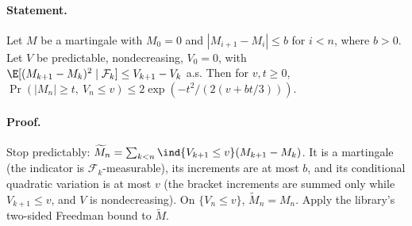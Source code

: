 \paragraph{Statement.} Let $M$ be a martingale with $M_0=0$ and $|M_{i+1}-M_i|\leq b$ for $i<n$, where
$b>0$. Let $V$ be predictable, nondecreasing, $V_0=0$, with
$\E[(M_{k+1}-M_k)^2\mid\mathcal F_k]\leq V_{k+1}-V_k$ a.s. Then for $v,t\geq0$,
$\Pr(|M_n|\geq t,\ V_n\leq v)\leq2\exp(-t^2/(2(v+bt/3)))$.
\paragraph{Proof.} Stop predictably: $\widetilde M_n=\sum_{k<n}\ind\{V_{k+1}\leq v\}(M_{k+1}-M_k)$. It is a
martingale (the indicator is $\mathcal F_k$-measurable), its increments are at most $b$, and its
conditional quadratic variation is at most $v$ (the bracket increments are summed only while
$V_{k+1}\leq v$, and $V$ is nondecreasing). On $\{V_n\leq v\}$, $\widetilde M_n=M_n$. Apply the
library's two-sided Freedman bound to $\widetilde M$.
